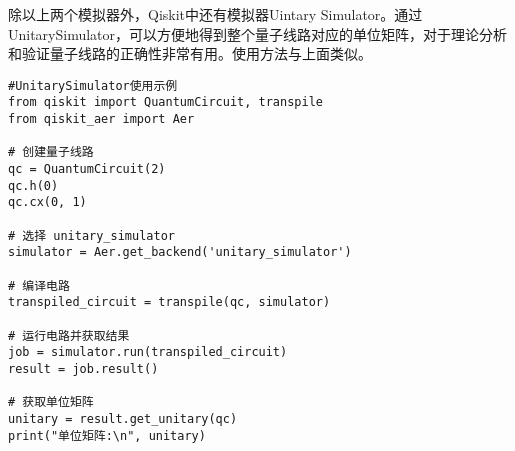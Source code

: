 除以上两个模拟器外，Qiskit中还有模拟器Uintary Simulator。通过UnitarySimulator，可以方便地得到整个量子线路对应的单位矩阵，对于理论分析和验证量子线路的正确性非常有用。使用方法与上面类似。
\begin{py}
\begin{lstlisting}
#UnitarySimulator使用示例
from qiskit import QuantumCircuit, transpile
from qiskit_aer import Aer

# 创建量子线路
qc = QuantumCircuit(2)
qc.h(0)
qc.cx(0, 1)

# 选择 unitary_simulator
simulator = Aer.get_backend('unitary_simulator')

# 编译电路
transpiled_circuit = transpile(qc, simulator)

# 运行电路并获取结果
job = simulator.run(transpiled_circuit)
result = job.result()

# 获取单位矩阵
unitary = result.get_unitary(qc)
print("单位矩阵:\n", unitary)  
\end{lstlisting}
\end{py}
